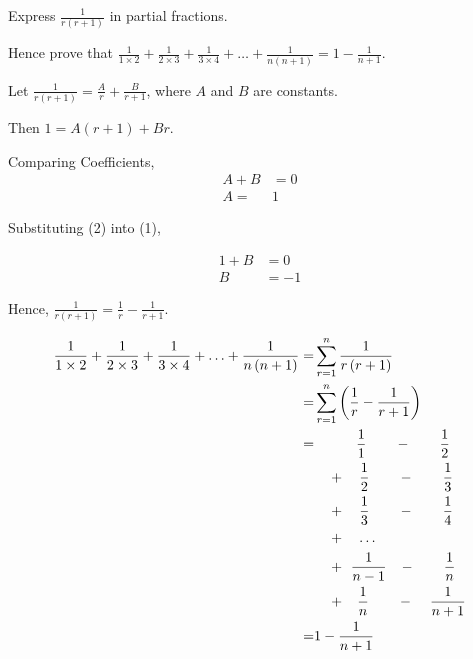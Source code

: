 \documentclass[11pt,a4paper]{book}
\begin{document}
\begin{example}

Express ${\displaystyle \frac{1}{r\left(r+1\right)}}$ in partial
fractions.

Hence prove that ${\displaystyle \frac{1}{1\times2}+\frac{1}{2\times3}+\frac{1}{3\times4}+\ldots+\frac{1}{n\left(n+1\right)}=1-\frac{1}{n+1}}$.

\Solution

Let ${\displaystyle \frac{1}{r\left(r+1\right)}=\frac{A}{r}+\frac{B}{r+1}}$,
where $A$ and $B$ are constants.

Then $1=A\left(r+1\right)+Br$.

Comparing Coefficients, 
\begin{align*}
A+B & =0\tag{1}\\
A= & 1\tag{2}
\end{align*}

Substituting (2) into (1), 

\begin{align*}
1+B & =0\\
B & =-1
\end{align*}

Hence, ${\displaystyle \frac{1}{r\left(r+1\right)}=\frac{1}{r}-\frac{1}{r+1}}$.

\begin{align*}
\frac{1}{1\times2}+\frac{1}{2\times3}+\frac{1}{3\times4}+\ldots+\frac{1}{n\left(n+1\right)}= & \sum_{r=1}^{n}\frac{1}{r\left(r+1\right)}\\
= & \sum_{r=1}^{n}\left(\frac{1}{r}-\frac{1}{r+1}\right)\\
= & \hspace{2em}\quad\frac{1}{1}\qquad-\qquad\frac{1}{2}\\
 & \quad+\quad\frac{1}{2}\qquad-\qquad\frac{1}{3}\\
 & \quad+\quad\frac{1}{3}\qquad-\qquad\frac{1}{4}\\
 & \quad+\quad\ldots\\
 & \quad+\hspace{0.14cm}\frac{1}{n-1}\hspace{0.3cm}-\qquad\frac{1}{n}\\
 & \quad+\hspace{0.3cm}\frac{1}{n}\qquad-\hspace{0.4cm}\frac{1}{n+1}\\
= & 1-\frac{1}{n+1}
\end{align*}

\end{example}
\end{document}
